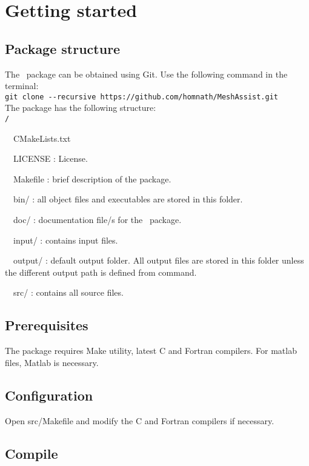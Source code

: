 \chapter{Getting started}
\label{chap:start}
\section{Package structure}
The \pack\ package can be obtained using Git. Use the following command in the terminal:\\

\texttt{git clone -{}-recursive https://github.com/homnath/MeshAssist.git}\\

The package has the following structure:\\

\texttt{\pack/}
\begin{adescription}{~~CMakeLists.txt}
\item[~~LICENSE]               : License.
\item[~~Makefile]                : brief description of the package.
\item[~~bin/]                  : all object files and executables are stored in this folder.
\item[~~doc/]                  : documentation file/s for the \pack\ package.
\item[~~input/]                : contains input files.
\item[~~output/]               : default output folder. All output files are stored in this folder unless the different output path is defined from command.
\item[~~src/]                  : contains all source files.
\end{adescription}
 
\section{Prerequisites}

The package requires Make utility, latest C and Fortran compilers. For matlab files, Matlab is necessary.

\section{Configuration}

Open src/Makefile and modify the C and Fortran compilers if necessary.

\section{Compile}

